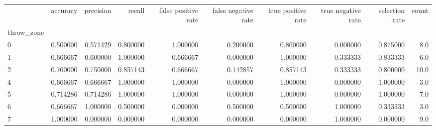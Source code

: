 \begin{tabular}{lrrrrrrrrr}
\toprule
{} &  accuracy &  precision &    recall &  false positive rate &  false negative rate &  true positive rate &  true negative rate &  selection rate &  count \\
throw\_zone &           &            &           &                      &                      &                     &                     &                 &        \\
\midrule
0          &  0.500000 &   0.571429 &  0.800000 &             1.000000 &             0.200000 &            0.800000 &            0.000000 &        0.875000 &    8.0 \\
1          &  0.666667 &   0.600000 &  1.000000 &             0.666667 &             0.000000 &            1.000000 &            0.333333 &        0.833333 &    6.0 \\
2          &  0.700000 &   0.750000 &  0.857143 &             0.666667 &             0.142857 &            0.857143 &            0.333333 &        0.800000 &   10.0 \\
4          &  0.666667 &   0.666667 &  1.000000 &             1.000000 &             0.000000 &            1.000000 &            0.000000 &        1.000000 &    3.0 \\
5          &  0.714286 &   0.714286 &  1.000000 &             1.000000 &             0.000000 &            1.000000 &            0.000000 &        1.000000 &    7.0 \\
6          &  0.666667 &   1.000000 &  0.500000 &             0.000000 &             0.500000 &            0.500000 &            1.000000 &        0.333333 &    3.0 \\
7          &  1.000000 &   0.000000 &  0.000000 &             0.000000 &             0.000000 &            0.000000 &            1.000000 &        0.000000 &    9.0 \\
\bottomrule
\end{tabular}
